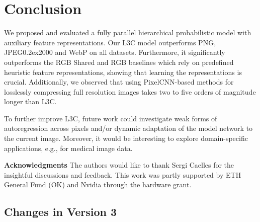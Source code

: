 \documentclass[10pt,twocolumn,letterpaper]{article}
\newcommand{\name}{L3C\xspace}
\newcommand{\jpegk}{JPEG\kern0.2ex2000\xspace}
\begin{document}
\vspace{-0.3ex}\section{Conclusion}\vspace{-0.2ex}

We proposed and evaluated a fully parallel hierarchical probabilistic model with auxiliary feature representations. 
Our \name model outperforms PNG, \jpegk and WebP on all datasets. Furthermore, it significantly outperforms the RGB Shared and RGB baselines which rely on predefined heuristic feature representations, showing that learning the representations is crucial. Additionally, we observed that using PixelCNN-based methods for losslessly compressing full resolution images takes two to five orders of magnitude longer than \name.

To further improve \name, future work could investigate weak forms of autoregression across pixels and/or dynamic adaptation of the model network to the current image. Moreover, it would be interesting to explore domain-specific applications, e.g., for medical image data.

\begin{spacing}{0.8}
\vfill
{\setlength{\parindent}{0cm}\footnotesize\selectfont
\textbf{Acknowledgments} The authors would like to thank Sergi Caelles for the insightful discussions and feedback.
This work was partly supported by ETH General Fund (OK) and Nvidia through the hardware grant.}
\end{spacing}



{\small


}

\clearpage



\appendix

\setcounter{table}{0}
\renewcommand{\thetable}{A\arabic{table}}
\setcounter{figure}{0}
\renewcommand{\thefigure}{A\arabic{figure}}


\subsection{Changes in Version 3} \label{sec:version3}
\end{document}
